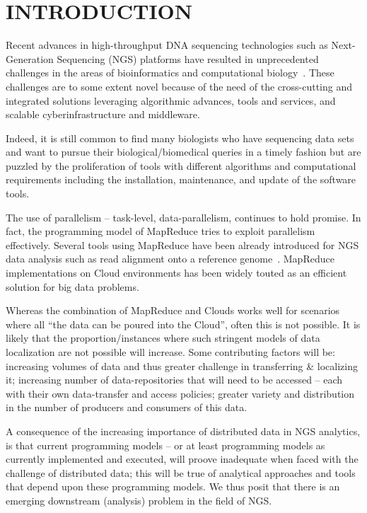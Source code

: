 \documentclass{sig-alternate}
\begin{document}
{\section{INTRODUCTION} 

Recent advances in high-throughput DNA sequencing technologies such as
Next-Generation Sequencing (NGS) platforms have resulted in
unprecedented challenges in the areas of bioinformatics and
computational
biology~\cite{metzker2010,1000genome,wang2009-natrevgen,alex2009,mcpherson2009}.
These challenges are to some extent novel because of the need of the
cross-cutting and integrated solutions leveraging algorithmic
advances, tools and services, and scalable cyberinfrastructure and
middleware.

Indeed, it is still common to find many biologists who have sequencing
data sets and want to pursue their biological/biomedical queries in a
timely fashion but are puzzled by the proliferation of tools with
different algorithms and computational requirements including the
installation, maintenance, and update of the software tools.

The use of parallelism -- task-level, data-parallelism, continues to
hold promise. In fact, the programming model of MapReduce tries to
exploit parallelism effectively.  Several tools using MapReduce have
been already introduced for NGS data analysis such as read alignment
onto a reference genome~\cite{cloudburst,
  gatk,langmead2009,seal2011,langmead2010, taylor2010}.  MapReduce
implementations on Cloud environments has been widely touted as an
efficient solution for big data
problems\cite{mapreduce-2004-dean,schatz-nature-biotech-2010,
  taylor2010}.

Whereas the combination of MapReduce and Clouds works well for
scenarios where all ``the data can be poured into the Cloud'', often
this is not possible.  It is likely that the proportion/instances
where such stringent models of data localization are not possible will
increase.  Some contributing factors will be: increasing volumes of
data and thus greater challenge in transferring \& localizing it;
increasing number of data-repositories that will need to be accessed
-- each with their own data-transfer and access policies; greater
variety and distribution in the number of producers and consumers of
this data. 

A consequence of the increasing importance of distributed data in NGS
analytics, is that current programming models -- or at least
programming models as currently implemented and executed, will proove
inadequate when faced with the challenge of distributed data; this
will be true of analytical approaches and tools that depend upon these
programming models. We thus posit that there is an emerging downstream
(analysis) problem in the field of NGS.

}
\end{document}
